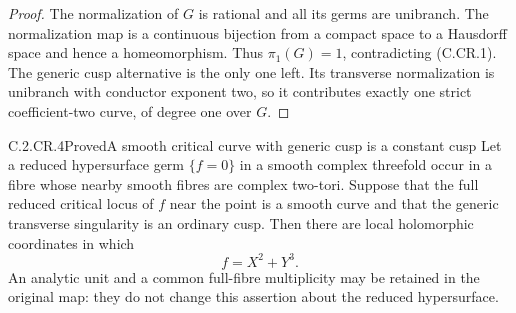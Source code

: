 \begin{proof}
The normalization of $G$ is rational and all its
germs are unibranch. The normalization map is a
continuous bijection from a compact space to a
Hausdorff space and hence a homeomorphism.
Thus $\pi_1(G)=1$, contradicting (C.CR.1).
The generic cusp alternative is the only one left.
Its transverse normalization is unibranch with
conductor exponent two, so it contributes exactly
one strict coefficient-two curve, of degree one
over $G$.
\end{proof}


\begin{statement}{C.2.CR.4}{Proved}{A smooth critical curve with generic cusp is a constant cusp}
Let a reduced hypersurface germ $\{f=0\}$ in a smooth
complex threefold occur in a fibre whose nearby smooth
fibres are complex two-tori. Suppose that the full reduced
critical locus of $f$ near the point is a smooth curve
and that the generic transverse singularity is an ordinary
cusp. Then there are local holomorphic coordinates in which
\[
                            f=X^2+Y^3.             \tag{C.CR.15}
\]
An analytic unit and a common full-fibre multiplicity may
be retained in the original map: they do not change this
assertion about the reduced hypersurface.
\end{statement}
